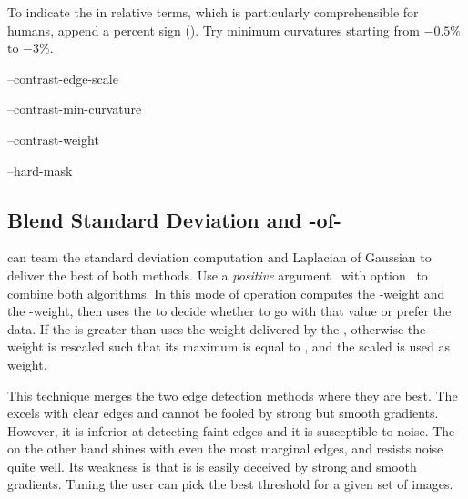 To indicate the  in relative terms, which is particularly comprehensible for
humans, append a percent sign (\sample{\%}).  Try minimum curvatures starting from $-0.5\%$ to
$-3\%$.

\begin{optionsummary}
\item[--contrast-edge-scale] \sectionName~
\item[--contrast-min-curvature] \sectionName~
\item[--contrast-weight] \sectionName~
\item[--hard-mask] \sectionName~
\end{optionsummary}


\subsection[Blend \acronym{SDev} and \acronym{LoG}]%
{\label{sec:blend-sdev-and-log}%
%
%
Blend Standard Deviation and \hyp{}of\hyp{}}

\App{} can team the standard deviation computation and Laplacian of Gaussian to deliver the best
of both methods.  Use a \emph{positive} argument~ with
option~ to combine both algorithms.  In this mode of operation
\App{} computes the -weight and the -weight, then uses the
 to decide whether to go with that value or prefer the  data.  If the
 is greater than  \App{} uses the weight delivered by the
, otherwise the -weight is rescaled such that its maximum is equal to
, and the scaled  is used as weight.

This technique merges the two edge detection methods where they are best.  The 
excels with clear edges and cannot be fooled by strong but smooth gradients.  However, it is
inferior at detecting faint edges and it is susceptible to noise.  The  on the
other hand shines with even the most marginal edges, and resists noise quite well.  Its weakness
is that is is easily deceived by strong and smooth gradients.  Tuning  the
user can pick the best threshold for a given set of images.

